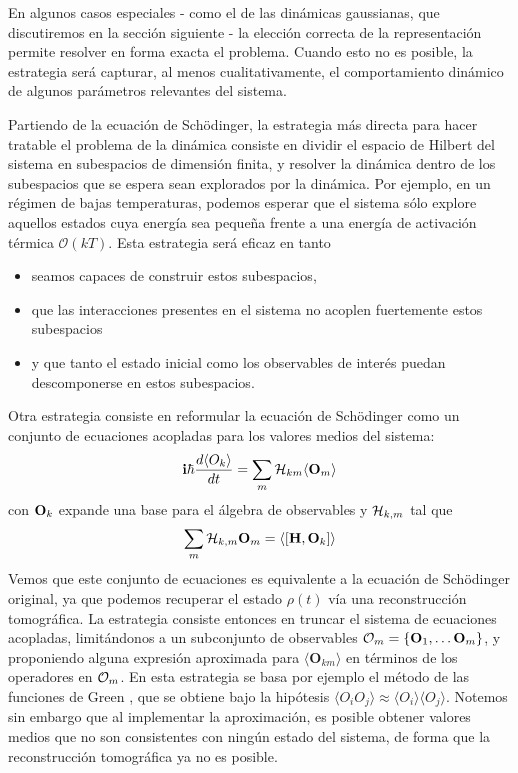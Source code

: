 \documentclass{report} %
\numberwithin{equation}{section}
\begin{document}
En algunos casos especiales - como el de las dinámicas gaussianas, que discutiremos en la sección siguiente - la elección correcta de la representación permite resolver en forma exacta el problema.
Cuando esto no es posible, la estrategia será capturar, al menos cualitativamente, el comportamiento dinámico de algunos parámetros relevantes del sistema. 

Partiendo  de la ecuación de Sch\"odinger, la estrategia más directa para hacer tratable el problema de la dinámica consiste en dividir el espacio de Hilbert del sistema en subespacios de dimensión finita, y resolver la dinámica dentro de los subespacios que se espera sean explorados por la dinámica.
Por ejemplo, en un régimen de bajas temperaturas, podemos esperar que el sistema sólo explore aquellos estados cuya energía sea pequeña frente a una energía de activación térmica $\mathcal{O}(k T)$. Esta estrategia será eficaz en tanto 

\begin{itemize}
    \item seamos capaces de construir estos subespacios,
    \item que las interacciones presentes en el sistema no acoplen fuertemente estos subespacios
    \item y que tanto el estado inicial como los observables de interés puedan descomponerse en estos subespacios.
\end{itemize}

Otra estrategia consiste en reformular la ecuación de Sch\"odinger como un conjunto de ecuaciones acopladas para los valores medios del sistema:
$$
\mathbf{ i}\hbar\frac{d\langle O_k\rangle}{dt}=\sum_{m}{\cal H}_{k m}\langle {\bf O}_m\rangle
$$
con ${\bf O}_k$ expande una base para el álgebra de observables y ${\cal H}_{k,m}$ tal que 
$$
\sum_{m}{\cal H}_{k,m}{\bf O}_m = \langle [{\bf H},{\bf O}_k]\rangle
$$
Vemos que este conjunto de ecuaciones es equivalente a la ecuación de Sch\"odinger original, ya que podemos recuperar el estado $\rho(t)$ vía una reconstrucción tomográfica.
La estrategia consiste entonces en truncar el sistema de ecuaciones acopladas, limitándonos a un subconjunto de observables ${\cal O}_m =\{\mathbf{O}_1,\ldots \mathbf{\bf O}_{m}\}$, y proponiendo  alguna expresión aproximada para $\langle \mathbf{O}_{k m}\rangle$ en términos de los operadores en ${\cal O}_m$.
En esta estrategia se basa por ejemplo el método de las funciones de Green \cite{Fetter},
que se obtiene bajo la hipótesis $\langle O_{i}O_{j}\rangle\approx \langle O_{i}\rangle\langle O_{j}\rangle$. Notemos sin embargo que al implementar la aproximación,  es posible obtener valores medios que no son consistentes con ningún estado del sistema, de forma que la reconstrucción tomográfica ya no es posible.
\end{document}
